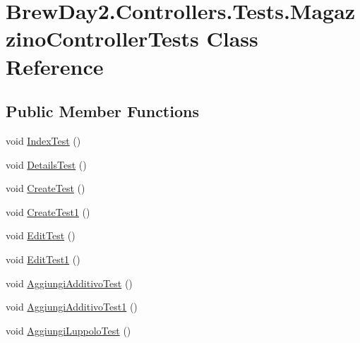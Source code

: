 \hypertarget{class_brew_day2_1_1_controllers_1_1_tests_1_1_magazzino_controller_tests}{}\section{Brew\+Day2.\+Controllers.\+Tests.\+Magazzino\+Controller\+Tests Class Reference}
\label{class_brew_day2_1_1_controllers_1_1_tests_1_1_magazzino_controller_tests}
\subsection*{Public Member Functions}
\begin{DoxyCompactItemize}
\item 
void \mbox{\hyperlink{class_brew_day2_1_1_controllers_1_1_tests_1_1_magazzino_controller_tests_a7e67c1aab9bd43294f1d1634fc1b0f96}{Index\+Test}} ()
\item 
void \mbox{\hyperlink{class_brew_day2_1_1_controllers_1_1_tests_1_1_magazzino_controller_tests_a49966d2e4ee089778c06af2d806c93e8}{Details\+Test}} ()
\item 
void \mbox{\hyperlink{class_brew_day2_1_1_controllers_1_1_tests_1_1_magazzino_controller_tests_a705f062a74b01df7971f9dcdbd665969}{Create\+Test}} ()
\item 
void \mbox{\hyperlink{class_brew_day2_1_1_controllers_1_1_tests_1_1_magazzino_controller_tests_af3679de7922a252935b898b65c7c7e68}{Create\+Test1}} ()
\item 
void \mbox{\hyperlink{class_brew_day2_1_1_controllers_1_1_tests_1_1_magazzino_controller_tests_a8cdb4c8d3a7e88973548775d9f4a7692}{Edit\+Test}} ()
\item 
void \mbox{\hyperlink{class_brew_day2_1_1_controllers_1_1_tests_1_1_magazzino_controller_tests_a0e77873f1e8896013ccbb0d96d7fd571}{Edit\+Test1}} ()
\item 
void \mbox{\hyperlink{class_brew_day2_1_1_controllers_1_1_tests_1_1_magazzino_controller_tests_a8d128b969941b77baf685eadae282e2f}{Aggiungi\+Additivo\+Test}} ()
\item 
void \mbox{\hyperlink{class_brew_day2_1_1_controllers_1_1_tests_1_1_magazzino_controller_tests_a5cf3501f192b74fa71eecc7675a5c031}{Aggiungi\+Additivo\+Test1}} ()
\item 
void \mbox{\hyperlink{class_brew_day2_1_1_controllers_1_1_tests_1_1_magazzino_controller_tests_a13179e671866de415765f851f8b373d6}{Aggiungi\+Luppolo\+Test}} ()

\end{DoxyCompactItemize}
